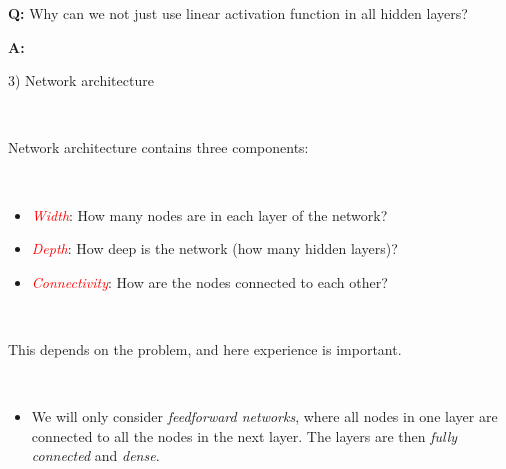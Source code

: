 \documentclass[10pt,ignorenonframetext,]{beamer}
\providecommand{\tightlist}{%
  \setlength{\itemsep}{0pt}\setlength{\parskip}{0pt}}
\begin{document}
\begin{frame}

\textbf{Q:} Why can we not just use linear activation function in all
hidden layers?

\textbf{A:}

\end{frame}

\begin{frame}

\begin{block}{3) Network architecture}

\(~\)

Network architecture contains three components:

\(~\)

\begin{itemize}
\item
  \emph{\textcolor{red}{Width}}: How many nodes are in each layer of the
  network?
\item
  \emph{\textcolor{red}{Depth}}: How deep is the network (how many
  hidden layers)?
\item
  \emph{\textcolor{red}{Connectivity}}: How are the nodes connected to
  each other?
\end{itemize}

\(~\)

This depends on the problem, and here experience is important.

\(~\)

\begin{itemize}
\tightlist
\item
  We will only consider \emph{feedforward networks}, where all nodes in
  one layer are connected to all the nodes in the next layer. The layers
  are then \emph{fully connected} and \emph{dense}.
\end{itemize}

\end{block}

\end{frame}
\end{document}

